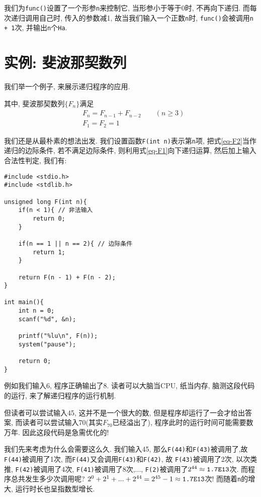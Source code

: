         我们为\texttt{func()}设置了一个形参\texttt{n}来控制它, 当形参小于等于0时, 不再向下递归. 而每次递归调用自己时, 传入的参数减1, 故当我们输入一个正数\texttt{n}时, \texttt{func()}会被调用\texttt{n + 1}次, 并输出\texttt{n}个\texttt{Ha}.

    \section{实例: 斐波那契数列}
        我们举一个例子, 来展示递归程序的应用.

        其中, 斐波那契数列$\{F_n\}$满足
        \begin{align}
            &F_n = F_{n-1} + F_{n-2} \qquad (n \geq 3) \tag{1} \label{eq-F1} \\
            &F_1 = F_2 = 1 \tag{2} \label{eq-F2}
        \end{align}

        我们还是从最朴素的想法出发. 我们设置函数\texttt{F(int n)}表示第\texttt{n}项, 把式\ref{eq-F2}当作递归的边际条件, 若不满足边际条件, 则利用式\ref{eq-F1}向下递归运算, 然后加上输入合法性判定, 我们有:
\begin{lstlisting}
#include <stdio.h>
#include <stdlib.h>

unsigned long F(int n){
    if(n < 1){ // 非法输入
        return 0;
    }

    if(n == 1 || n == 2){ // 边际条件
        return 1;
    }

    return F(n - 1) + F(n - 2);
}

int main(){
    int n = 0;
    scanf("%d", &n);

    printf("%lu\n", F(n));
    system("pause");

    return 0;
}
\end{lstlisting}

        例如我们输入6, 程序正确输出了8. 读者可以大脑当CPU, 纸当内存, 脑测这段代码的运行, 来了解递归程序的运行机制.

        但读者可以尝试输入45, 这并不是一个很大的数, 但是程序却运行了一会才给出答案, 而读者可以尝试输入70(其实$F_70$已经溢出了), 程序此时的运行时间可能需要数万年. 因此这段代码是急需优化的!

        我们先来考虑为什么会需要这么久. 我们输入45, 那么\texttt{F(44)}和\texttt{F(43)}被调用了,故 \texttt{F(44)}被调用了1次, 而\texttt{F(44)}又会调用\texttt{F(43)}和\texttt{F(42)}, 故 \texttt{F(43)}被调用了2次, 以次类推, \texttt{F(42)}被调用了4次, \texttt{F(41)}被调用了8次,..., \texttt{F(2)}被调用了$2^{44} \approx \mbox{\texttt{1.7E13}}$次. 而程序总共发生多少次调用呢? $2^0 + 2^1 + ... + 2^{44} = 2^{45} - 1 \approx \mbox{\texttt{1.7E13}}$次! 而随着\texttt{n}的增大, 运行时长也呈指数型增长.

